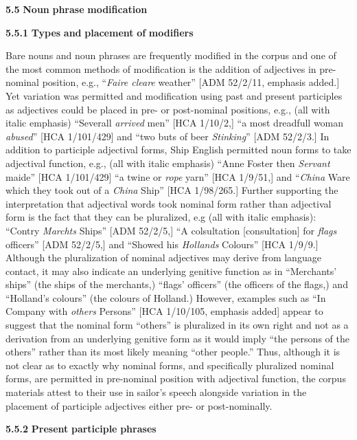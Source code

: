 \textbf{5.5} \textbf{Noun} \textbf{phrase} \textbf{modification} 

\textbf{5.5.1} \textbf{Types} \textbf{and} \textbf{placement} \textbf{of} \textbf{modifiers}

  Bare nouns and noun phrases are frequently modified in the corpus and one of the most common methods of modification is the addition of adjectives in pre-nominal position, e.g., “\textit{Faire cleare} weather” [ADM 52/2/11, emphasis added.] Yet variation was permitted and modification using past and present participles as adjectives could be placed in pre- or post-nominal positions, e.g., (all with italic emphasis) “Severall \textit{arrived} men” [HCA 1/10/2,] “a most dreadfull woman \textit{abused}” [HCA 1/101/429] and “two buts of beer \textit{Stinking}” [ADM 52/2/3.]  In addition to participle adjectival forms, Ship English permitted noun forms to take adjectival function, e.g., (all with italic emphasis) “Anne Foster then \textit{Servant} maide” [HCA 1/101/429] “a twine or \textit{rope} yarn” [HCA 1/9/51,] and “\textit{China} Ware which they took out of a \textit{China} Ship” [HCA 1/98/265.] Further supporting the interpretation that adjectival words took nominal form rather than adjectival form is the fact that they can be pluralized, e.g (all with italic emphasis): “Contry \textit{Marchts} Ships” [ADM 52/2/5,] “A colsultation [consultation] for \textit{flags} officers” [ADM 52/2/5,] and “Showed his \textit{Hollands} Colours” [HCA 1/9/9.] Although the pluralization of nominal adjectives may derive from language contact, it may also indicate an underlying genitive function as in “Merchants’ ships” (the ships of the merchants,) “flags’ officers” (the officers of the flags,) and “Holland’s colours” (the colours of Holland.) However, examples such as “In Company with \textit{others} Persons” [HCA 1/10/105, emphasis added] appear to suggest that the nominal form “others” is pluralized in its own right and not as a derivation from an underlying genitive form as it would imply “the persons of the others” rather than its most likely meaning “other people.” Thus, although it is not clear as to exactly why nominal forms, and specifically pluralized nominal forms, are permitted in pre-nominal position with adjectival function, the corpus materials attest to their use in sailor’s speech alongside variation in the placement of participle adjectives either pre- or post-nominally. 

  \textbf{5.5.2} \textbf{Present} \textbf{participle} \textbf{phrases} 

